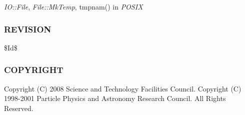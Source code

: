 \emph{IO::File}, \emph{File::MkTemp}, \textsf{tmpnam()} in \emph{POSIX}

\subsubsection*{REVISION\label{ORAC::TempFile_REVISION}}


\$Id\$

\subsubsection*{COPYRIGHT\label{ORAC::TempFile_COPYRIGHT}}


Copyright (C) 2008 Science and Technology Facilities Council.
Copyright (C) 1998-2001 Particle Physics and Astronomy Research
Council. All Rights Reserved.


